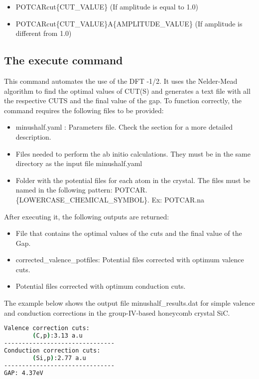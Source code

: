 \begin{itemize}
    \item POTCARcut\{CUT\_VALUE\} (If amplitude is equal to 1.0)
    \item POTCARcut\{CUT\_VALUE\}A\{AMPLITUDE\_VALUE\} (If amplitude is different from 1.0)
\end{itemize}

    
\subsection{The execute command}

This command automates the use of the DFT -1/2. It uses the Nelder-Mead algorithm \cite{10.1093/comjnl/7.4.308} to find the optimal values of CUT(S) and generates a text file with all the respective CUTS and the final value of the gap. To function correctly, the command requires the following files to be provided:

\begin{itemize}
    \item minushalf.yaml : Parameters file. Check the  section for a more detailed description.
    \item Files needed to perform the ab initio calculations. They must be in the same directory as the input file minushalf.yaml
    \item Folder with the potential files for each atom in the crystal. The files must be named in the following pattern: POTCAR.\{LOWERCASE\_CHEMICAL\_SYMBOL\}. Ex: POTCAR.na
\end{itemize}

After executing it, the following outputs are returned:

\begin{itemize}
    \item File that contains the optimal values of the cuts and the final value of the Gap.
    \item corrected\_valence\_potfiles: Potential files corrected with optimum valence cuts.
    \item  Potential files corrected with optimum conduction cuts.
\end{itemize}

The example below shows the output file minushalf\_results.dat  for simple valence and  conduction corrections in the group-IV-based honeycomb crystal SiC.


\begin{lstlisting}[language=bash,caption={Example of minushalf\_results.dat for SiC-2D}]
Valence correction cuts:
        (C,p):3.13 a.u
-------------------------------
Conduction correction cuts:
        (Si,p):2.77 a.u
-------------------------------
GAP: 4.37eV
\end{lstlisting}

